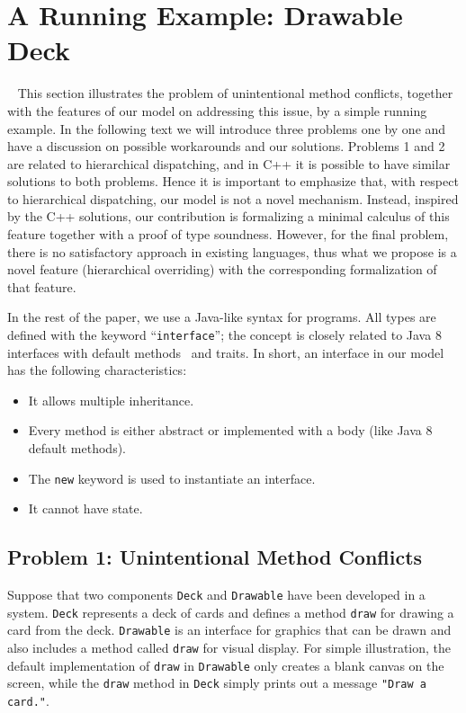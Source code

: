 \section{A Running Example: Drawable Deck}~\label{sec:overview}
This section illustrates the problem of unintentional method conflicts,
together with the features of our model on addressing this issue, by
a simple running example. In the following text we will introduce three
problems one by one and have a discussion on possible workarounds and
our solutions.
Problems 1 and 2 are related to hierarchical dispatching, and in 
C++ it is possible to have similar solutions to both
problems. Hence it is important to emphasize that, with respect to
hierarchical dispatching, our model is not a novel
mechanism. Instead, 
inspired by the C++ solutions, our contribution is formalizing a minimal calculus
of this feature together with a proof of type soundness. However, for the final problem, there is no satisfactory approach
in existing languages, thus what we propose is a novel feature (hierarchical
overriding) with the corresponding formalization of that feature.

In the rest of the paper, we use a Java-like syntax for programs. All types are defined with the keyword
``\lstinline|interface|''; the concept is closely related to Java 8
interfaces with default methods~\cite{bono14} and traits. In short, 
an interface in our model has the following characteristics:
\begin{itemize}
	\item It allows multiple inheritance.
	\item Every method is either abstract or implemented with a body (like Java 8 default methods). 
	\item The \lstinline|new| keyword is used to instantiate an interface.
	\item It cannot have state.
\end{itemize}


\subsection{Problem 1: Unintentional Method Conflicts}\label{subsec:problem1}
Suppose that two components \lstinline|Deck| and \lstinline|Drawable| 
have been developed in a system. \lstinline|Deck| represents a deck
of cards and defines a method \lstinline|draw| for drawing a card from the
deck.  \lstinline|Drawable| is an interface for graphics that
can be drawn and also includes a method called \lstinline|draw| for
visual display. For simple illustration, the default implementation of
\lstinline|draw| in \lstinline|Drawable| only creates a blank canvas
on the screen, while the \lstinline|draw| method in \lstinline|Deck| simply
prints out a message \lstinline|"Draw a card."|.


